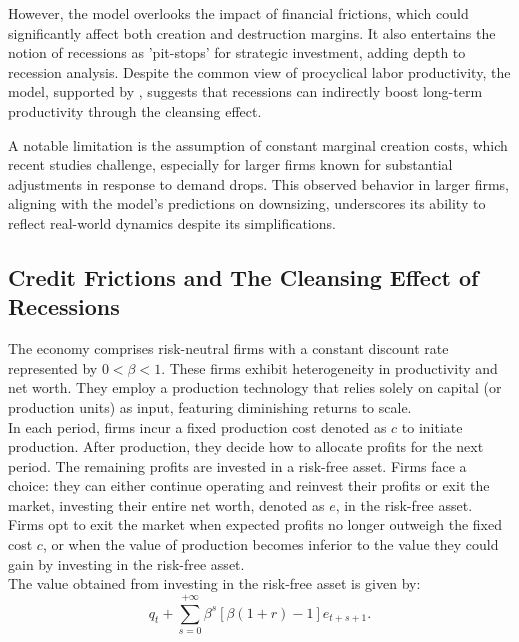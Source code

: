 \documentclass[12pt]{report}
\begin{document}
However, the model overlooks the impact of financial frictions, which could significantly affect both creation and
destruction margins. It also entertains the notion of recessions as 'pit-stops' for strategic investment, adding depth
to recession analysis. Despite the common view of procyclical labor productivity, the model, supported by
\cite{GaHam92},  suggests that recessions can indirectly boost long-term productivity through the cleansing effect.

A notable limitation is the assumption of constant marginal creation costs, which recent studies challenge, especially
for larger firms known for substantial adjustments in response to demand drops. This observed behavior in larger firms,
aligning with the model's predictions on downsizing, underscores its ability to reflect real-world dynamics despite  its
simplifications.
\subsection{Credit Frictions and The Cleansing Effect of Recessions}
The economy comprises risk-neutral firms with a constant discount rate represented by $0 < \beta < 1$. These firms
exhibit heterogeneity in productivity and net worth. They employ a production technology that relies solely on capital
(or production units) as input, featuring diminishing returns to scale.
\\
In each period, firms incur a fixed production cost denoted as $c$ to initiate production. After production, they decide
how to allocate profits for the next period. The remaining profits are invested in a risk-free asset. Firms face a
choice: they can either continue operating and reinvest their profits or exit the market, investing their entire net
worth, denoted as $e$, in the risk-free asset.
\\
Firms opt to exit the market when expected profits no longer outweigh the fixed cost $c$, or when the value of
production becomes inferior to the value they could gain by investing in the risk-free asset.
\\
The value obtained from investing in the risk-free asset is given by:
\[
q_t + \sum_{s=0}^{+\infty}\beta^s[\beta(1+r)-1]e_{t+s+1}.
\]
\end{document}
